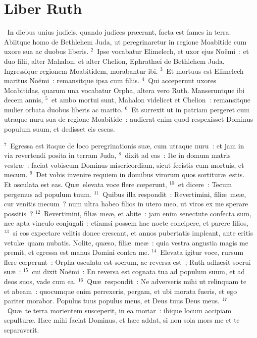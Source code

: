 {\centering \section*{Liber Ruth}}\thispagestyle{empty}

~In diebus unius judicis, quando judices pr\ae erant, facta est fames in terra. Abiitque homo de Bethlehem Juda, ut peregrinaretur in regione Moabitide cum uxore sua ac duobus liberis.
${}^{2}$~Ipse vocabatur Elimelech, et uxor ejus No\"emi~: et duo filii, alter Mahalon, et alter Chelion, Ephrath\ae i de Bethlehem Juda. Ingressique regionem Moabitidem, morabantur ibi.
${}^{3}$~Et mortuus est Elimelech maritus No\"emi~: remansitque ipsa cum filiis.
${}^{4}$~Qui acceperunt uxores Moabitidas, quarum una vocabatur Orpha, altera vero Ruth. Manseruntque ibi decem annis,
${}^{5}$~et ambo mortui sunt, Mahalon videlicet et Chelion~: remansitque mulier orbata duobus liberis ac marito.
${}^{6}$~Et surrexit ut in patriam pergeret cum utraque nuru sua de regione Moabitide~: audierat enim quod respexisset Dominus populum suum, et dedisset eis escas.


${}^{7}$~Egressa est itaque de loco peregrinationis su\ae , cum utraque nuru~: et jam in via revertendi posita in terram Juda,
${}^{8}$~dixit ad eas~: Ite in domum matris vestr\ae~: faciat vobiscum Dominus misericordiam, sicut fecistis cum mortuis, et mecum.
${}^{9}$~Det vobis invenire requiem in domibus virorum quos sortitur\ae\ estis. Et osculata est eas. Qu\ae\ elevata voce flere cœperunt,
${}^{10}$~et dicere~: Tecum pergemus ad populum tuum.
${}^{11}$~Quibus illa respondit~: Revertimini, fili\ae\ me\ae , cur venitis mecum~? num ultra habeo filios in utero meo, ut viros ex me sperare possitis~?
${}^{12}$~Revertimini, fili\ae\ me\ae , et abite~: jam enim senectute confecta sum, nec apta vinculo conjugali~: etiamsi possem hac nocte concipere, et parere filios,
${}^{13}$~si eos expectare velitis donec crescant, et annos pubertatis impleant, ante eritis vetul\ae\ quam nubatis. Nolite, qu\ae so, fili\ae\ me\ae~: quia vestra angustia magis me premit, et egressa est manus Domini contra me.
${}^{14}$~Elevata igitur voce, rursum flere cœperunt~: Orpha osculata est socrum, ac reversa est~; Ruth adh\ae sit socrui su\ae~:
${}^{15}$~cui dixit No\"emi~: En reversa est cognata tua ad populum suum, et ad deos suos, vade cum ea.
${}^{16}$~Qu\ae\ respondit~: Ne adverseris mihi ut relinquam te et abeam~: quocumque enim perrexeris, pergam, et ubi morata fueris, et ego pariter morabor. Populus tuus populus meus, et Deus tuus Deus meus.
${}^{17}$~Qu\ae\ te terra morientem susceperit, in ea moriar~: ibique locum accipiam sepultur\ae . H\ae c mihi faciat Dominus, et h\ae c addat, si non sola mors me et te separaverit.


